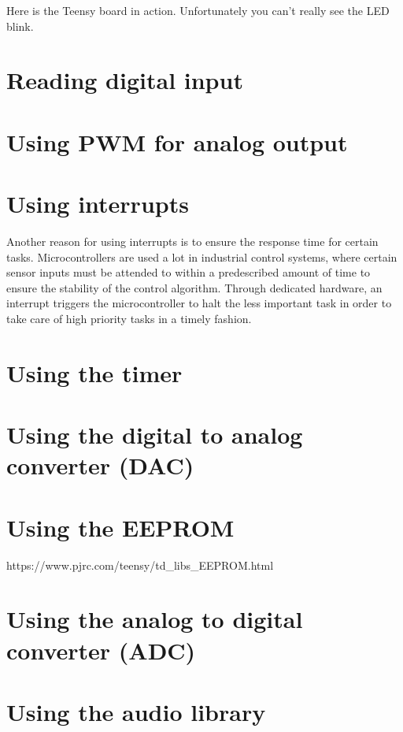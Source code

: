 \documentclass[letterpaper, 11pt]{article}
\begin{document}
Here is the Teensy board in action. Unfortunately you can't really see the LED blink. 


\section{Reading digital input}

\section{Using PWM for analog output}

\section{Using interrupts}

Another reason for using interrupts is to ensure the response time for certain tasks. Microcontrollers are used a lot in industrial control systems, where certain sensor inputs must be attended to within a predescribed amount of time to ensure the stability of the control algorithm. Through dedicated hardware, an interrupt triggers the microcontroller to halt the less important task in order to take care of high priority tasks in a timely fashion.

\section{Using the timer}

\section{Using the digital to analog converter (DAC)}

\section{Using the EEPROM}

https://www.pjrc.com/teensy/td_libs_EEPROM.html

\section{Using the analog to digital converter (ADC)}

\section{Using the audio library}
\end{document}
